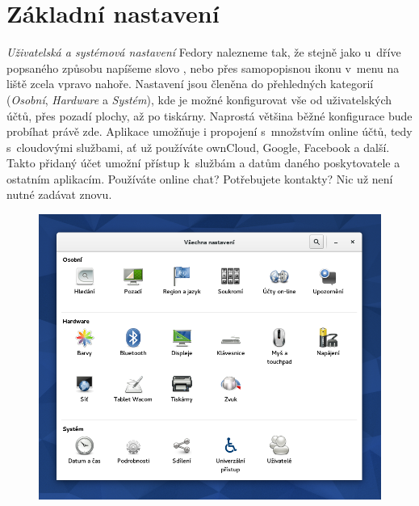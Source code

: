 \section*{Základní nastavení}
\emph{Uživatelská a systémová nastavení} Fedory nalezneme tak, že stejně jako u~dříve popsaného způsobu napíšeme slovo , nebo přes samopopisnou ikonu v~menu na liště zcela vpravo nahoře. Nastavení jsou členěna do přehledných kategorií (\emph{Osobní}, \emph{Hardware} a \emph{Systém}), kde je možné konfigurovat vše od uživatelských účtů, přes pozadí plochy, až po tiskárny. Naprostá většina běžné konfigurace bude probíhat právě zde. Aplikace umožňuje i propojení s~množstvím online účtů, tedy s~cloudovými službami, ať už používáte ownCloud, Google, Facebook a další. Takto přidaný účet umožní přístup k~službám a datům daného poskytovatele a ostatním aplikacím. Používáte online chat? Potřebujete kontakty? Nic už není nutné zadávat znovu.


\begin{figure}[t]
\begin{center}
\includegraphics[width=\textwidth]{img/nastaveni}
 \label{fig:nastaveni}
\end{center}
\end{figure}

